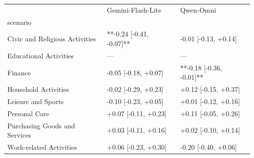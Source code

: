 \begin{tabular}{lll}
\toprule
 & Gemini-Flash-Lite & Qwen-Omni \\
scenario &  &  \\
\midrule
Civic and Religious Activities & **-0.24 [-0.41, -0.07]** & -0.01 [-0.13, +0.14] \\
Educational Activities & — & — \\
Finance & -0.05 [-0.18, +0.07] & **-0.18 [-0.36, -0.01]** \\
Household Activities & -0.02 [-0.29, +0.23] & +0.12 [-0.15, +0.37] \\
Leisure and Sports & -0.10 [-0.23, +0.05] & +0.01 [-0.12, +0.16] \\
Personal Care & +0.07 [-0.11, +0.23] & +0.11 [-0.05, +0.26] \\
Purchasing Goods and Services & +0.03 [-0.11, +0.16] & +0.02 [-0.10, +0.14] \\
Work-related Activities & +0.06 [-0.23, +0.30] & -0.20 [-0.40, +0.06] \\
\bottomrule
\end{tabular}
